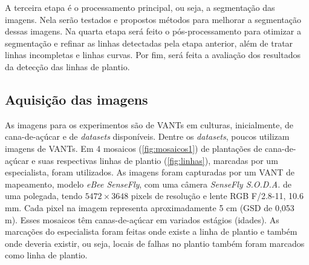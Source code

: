 \documentclass[12pt, a4paper, english, brazil]{article}
\begin{document}
A terceira etapa é o processamento principal, ou seja, a segmentação das imagens. Nela serão testados e propostos métodos para melhorar a segmentação dessas imagens. Na quarta etapa será feito o pós-processamento para otimizar a segmentação e refinar as linhas detectadas pela etapa anterior, além de tratar linhas incompletas e linhas curvas. Por fim, será feita a avaliação dos resultados da detecção das linhas de plantio.

\subsection{Aquisição das imagens}

As imagens para os experimentos são de VANTs em culturas, inicialmente, de cana-de-açúcar e de \textit{datasets} disponíveis. Dentre os \textit{datasets}, poucos utilizam imagens de VANTs. Em  4 mosaicos (\autoref{fig:mosaicos1}) de plantações de cana-de-açúcar e suas respectivas linhas de plantio (\autoref{fig:linhas}), marcadas por um especialista, foram utilizados. As imagens foram capturadas por um VANT de mapeamento, modelo \textit{eBee SenseFly}, com uma câmera \textit{SenseFly S.O.D.A.} de uma polegada, tendo $5472\times3648$ pixels de resolução e lente RGB F/2.8-11, 10.6 mm. Cada pixel na imagem representa aproximadamente 5 cm (GSD de 0,053 m). Esses mosaicos têm canas-de-açúcar em variados estágios (idades). As marcações do especialista foram feitas onde existe a linha de plantio e também onde deveria existir, ou seja, locais de falhas no plantio também foram marcados como linha de plantio.
\end{document}
